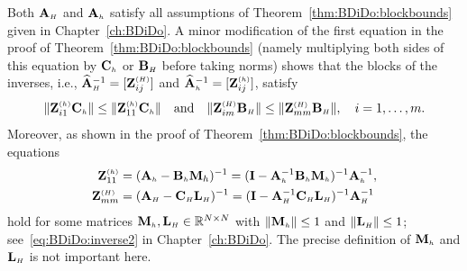Both $\matAH$ and $\matAh$ satisfy all assumptions
of Theorem~\ref{thm:BDiDo:blockbounds} given in Chapter~\ref{ch:BDiDo}. A minor
modification of the first equation in the proof of Theorem~\ref{thm:BDiDo:blockbounds} (namely
multiplying both sides of this equation by $\matCh$ or $\matBH$ before taking norms) shows that the blocks of the
inverses, i.e., $\matAHhat^{-1}=[\Z^{\klein{(H)}}_{ij}]$ and
$\matAhhat^{-1}=[\Z^{\klein{(h)}}_{ij}]$, satisfy
%
\begin{align}\label{eq:2D:decay}
\|\Z^{\klein{(h)}}_{i1}\matCh\|\leq \|\Z^{\klein{(h)}}_{11}\matCh\|
\quad \mbox{and} \quad
\|\Z^{\klein{(H)}}_{im}\matBH\|\leq \|\Z^{\klein{(H)}}_{mm}\matBH\|,
\quad i=1,\dots,m.
\end{align}
%
Moreover, as shown in the proof of Theorem~\ref{thm:BDiDo:blockbounds}, the
equations
%
\begin{align*}
\Z_{11}^{\klein{(h)}} &= (\matAh-\matBh \M_h)^{-1} =
(\I-\matAh^{-1}\matBh \M_{\klein{h}})^{-1}\matAh^{-1},\\
\Z_{mm}^{\klein{(H)}} &= (\matAH-\matCH \L_{\klein{H}})^{-1}=
(\I-\matAH^{-1}\matCH \L_{\klein{H}})^{-1}\matAH^{-1}
\end{align*}
%
hold for some matrices $\M_{\klein{h}},\L_{\klein{H}}\in\mathbb{R}^{N\times N}$
with $\|\M_{\klein{h}}\|\leq 1$ and $\|\L_{\klein{H}}\|\leq 1$;
see~\eqref{eq:BDiDo:inverse2} in Chapter~\ref{ch:BDiDo}. The precise definition
of $\M_{\klein{h}}$ and $\L_{\klein{H}}$ is not important here.

